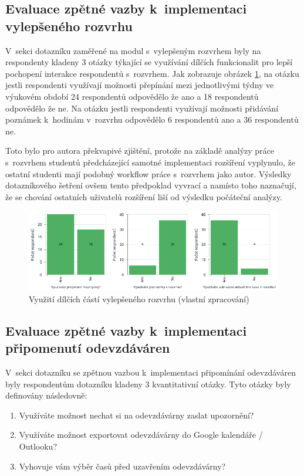 \subsection{Evaluace zpětné vazby k~implementaci vylepšeného rozvrhu}

V~sekci dotazníku zaměřené na modul s~vylepšeným rozvrhem byly na respondenty kladeny 3 otázky týkající se využívání dílčích funkcionalit pro lepší pochopení interakce respondentů s~rozvrhem. Jak zobrazuje obrázek \ref{fig:timetable-feedback}, na otázku jestli respondenti využívají možnosti přepínání mezi jednotlivými týdny ve výukovém období 24 respondentů odpovědělo že ano a 18 respondentů odpovědělo že ne. Na otázku jestli respondenti využívají možnosti přidávání poznámek k~hodinám v~rozvrhu odpovědělo 6 respondentů ano a 36 respondentů ne. 

Toto bylo pro autora překvapivé zjištění, protože na základě analýzy práce s~rozvrhem studentů předcházející samotné implementaci rozšíření vyplynulo, že ostatní studenti mají podobný workflow práce s~rozvrhem jako autor. Výsledky dotazníkového šetření ovšem tento předpoklad vyvrací a namísto toho naznačují, že se chování ostatních uživatelů rozšíření liší od výsledku počáteční analýzy.

\begin{figure}[htbp!]\centering
    \includegraphics[width=\textwidth]{img/timetable.png}
    \caption{Využití dílčích částí vylepšeného rozvrhu (vlastní zpracování)}
    \label{fig:timetable-feedback}
\end{figure}

\subsection{Evaluace zpětné vazby k~implementaci připomenutí odevzdáváren}


V~sekci dotazníku se zpětnou vazbou k~implementaci připomínání odevzdáváren byly respondentům dotazníku kladeny 3 kvantitativní otázky. Tyto otázky byly definovány následovně:

\begin{enumerate}
    \item Využíváte možnost nechat si na odevzdávárny zaslat upozornění?
    \item Využíváte možnost exportovat odevzdávárny do Google kalendáře / Outlooku?
    \item Vyhovuje vám výběr časů před uzavřením odevzdávárny?
\end{enumerate}

